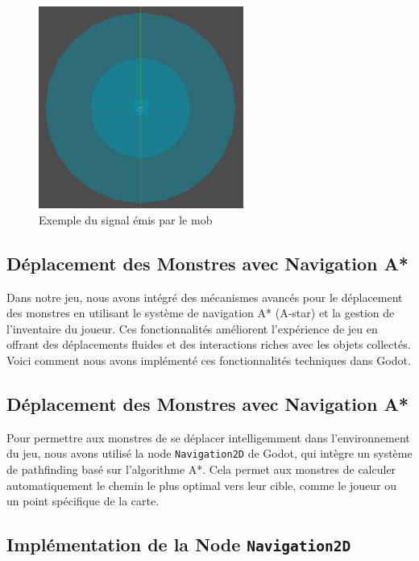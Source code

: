       \begin{figure}[H]
            \centering
            \includegraphics[width=0.6\textwidth]{assets/mob.png}
            \caption{Exemple du signal émis par le mob}
            \label{fig:website1}
        \end{figure}





\subsection{Déplacement des Monstres avec Navigation A* }




Dans notre jeu, nous avons intégré des mécanismes avancés pour le déplacement des monstres en utilisant le système de navigation A* (A-star) et 
la gestion de l'inventaire du joueur. Ces fonctionnalités améliorent l'expérience de jeu en offrant des déplacements fluides et des interactions riches
 avec les objets collectés. Voici comment nous avons implémenté ces fonctionnalités techniques dans Godot.

\subsection*{Déplacement des Monstres avec Navigation A*}

Pour permettre aux monstres de se déplacer intelligemment dans l'environnement du jeu, nous avons utilisé la node 
\texttt{Navigation2D} de Godot, qui intègre un système de pathfinding basé sur l'algorithme A*. Cela permet aux monstres 
de calculer automatiquement le chemin le plus optimal vers leur cible, comme le joueur ou un point spécifique de la carte.

\subsection*{Implémentation de la Node \texttt{Navigation2D}}

